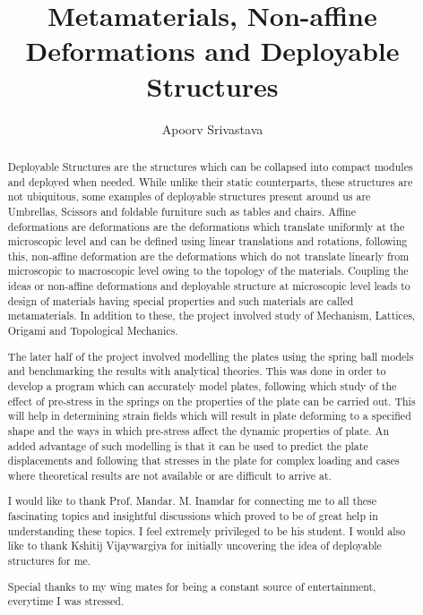 \documentclass[a4paper, twoside]{report}
\title{Metamaterials, Non-affine Deformations and Deployable Structures}
\author{Apoorv Srivastava}
\begin{document}


\begin{abstract}
Deployable Structures are the structures which can be collapsed into compact modules and deployed when needed. While unlike their static counterparts, these structures are not ubiquitous, some examples of deployable structures present around us are Umbrellas, Scissors and foldable furniture such as tables and chairs. Affine deformations are deformations are the deformations which translate uniformly at the microscopic level and can be defined using linear translations and rotations, following this, non-affine deformation are the deformations which do not translate linearly from microscopic to macroscopic level owing to the topology of the materials. Coupling the ideas or non-affine deformations and deployable structure at microscopic level leads to design of materials having special properties and such materials are called metamaterials. In addition to these, the project involved study of Mechanism, Lattices, Origami and Topological Mechanics.

The later half of the project involved modelling the plates using the spring ball models and benchmarking the results with analytical theories. This was done in order to develop a program which can accurately model plates, following which study of the effect of pre-stress in the springs on the properties of the plate can be carried out. This will help in determining strain fields which will result in plate deforming to a specified shape and the ways in which pre-stress affect the dynamic properties of plate. An added advantage of such modelling is that it can be used to predict the plate displacements and following that stresses in the plate for complex loading and cases where theoretical results are not available or are difficult to arrive at.


\end{abstract}

\renewcommand{\abstractname}{Acknowledgements}
\begin{abstract}
I would like to thank Prof. Mandar. M. Inamdar for connecting me to all these fascinating topics and insightful discussions which proved to be of great help in understanding these topics. I feel extremely privileged to be his student. I would also like to thank Kshitij Vijaywargiya for initially uncovering the idea of deployable structures for me. 

Special thanks to my wing mates for being a constant source of entertainment, everytime I was stressed.
\end{abstract}

\tableofcontents
\listoffigures









\end{document}
